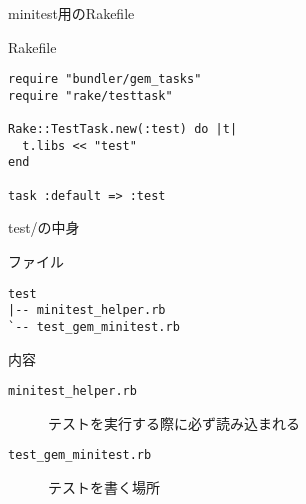 \documentclass[t, aspectratio=169]{beamer}
\begin{document}
\begin{frame}[fragile,label=sec-6-2-2]{minitest用のRakefile}
 \begin{block}{Rakefile}
\begin{verbatim}
require "bundler/gem_tasks"
require "rake/testtask"

Rake::TestTask.new(:test) do |t|
  t.libs << "test"
end

task :default => :test
\end{verbatim}
\end{block}
\end{frame}

\begin{frame}[fragile,label=sec-6-2-3]{test/の中身}
 \begin{block}{ファイル}
\begin{verbatim}
test
|-- minitest_helper.rb
`-- test_gem_minitest.rb
\end{verbatim}
\end{block}
\begin{block}{内容}
\begin{description}
\item[{\texttt{minitest\_helper.rb}}] テストを実行する際に必ず読み込まれる
\item[{\texttt{test\_gem\_minitest.rb}}] テストを書く場所
\end{description}
\end{block}
\end{frame}
\end{document}
